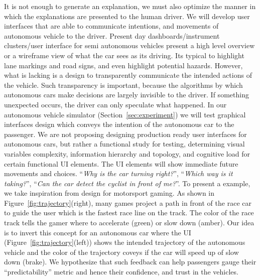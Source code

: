 It is not enough to generate an explanation, we must also optimize the manner in which the explanations are presented to the human driver. 
We will develop user interfaces that are able to communicate intentions, and movements of autonomous vehicle to the driver.
Present day dashboards/instrument clusters/user interface for semi autonomous vehicles present a high level overview or a wireframe view of what the car sees as its driving. Its typical to highlight lane markings and road signs, and even highlight potential hazards.
However, what is lacking is a design to transparently communicate the intended actions of the vehicle. 
Such transparency is important, because the algorithms by which autonomous cars make decisions are largely invisible to the driver.
If something unexpected occurs, the driver can only speculate what happened. 
In our autonomous vehicle simulator (Section~\ref{sec:experiment}) we will test graphical interfaces design which conveys the intention of the autonomous car to the passenger. 
We are not proposing designing production ready user interfaces for autonomous cars, but rather a functional study for testing, determining visual variables complexity, information hierarchy and topology, and cognitive load for certain functional UI elements. 
The UI elements will show immediate future movements and choices. ``\textit{Why is the car turning right?}'', ``\textit{Which way is it taking?}'', ``\textit{Can the car detect the cyclist in front of me?}''.
To present a example, we take inspiration from design for motorsport gaming. As shown in Figure~\ref{fig:trajectory}(right), many games project a path in front of the race car to guide the user which is the fastest race line on the track. The color of the race track tells the gamer where to accelerate (green) or slow down (amber). Our idea is to invert this concept for an autonomous car where the UI (Figure~\ref{fig:trajectory}(left)) shows the intended trajectory of the autonomous vehicle and the color of the trajectory coveys if the car will speed up of slow down (brake). We hypothesize that such feedback can help passengers gauge their ``predictability'' metric and hence their confidence, and trust in the vehicles. 


